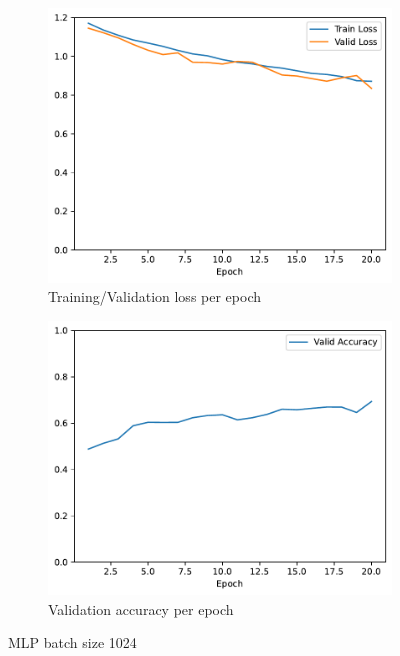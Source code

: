 \documentclass[11pt]{article}
\begin{document}
\begin{figure}[h!]
\centering
\begin{subfigure}{.5\textwidth}
  \centering
  \includegraphics[width=.9\linewidth]{plots/mlp-training-loss-batch-1024-lr-0.1-epochs-20-hidden-200-dropout-0.0-l2-0.0-layers-2-act-relu-opt-sgd}
  \caption{Training/Validation loss per epoch}
\end{subfigure}%
\begin{subfigure}{.5\textwidth}
  \centering
  \includegraphics[width=.9\linewidth]{plots/mlp-validation-accuracy-batch-1024-lr-0.1-epochs-20-hidden-200-dropout-0.0-l2-0.0-layers-2-act-relu-opt-sgd}
  \caption{Validation accuracy per epoch}
\end{subfigure}
\caption{MLP batch size 1024}
\label{fig:MLP_batch_size_1024}
\end{figure}
\end{document}
